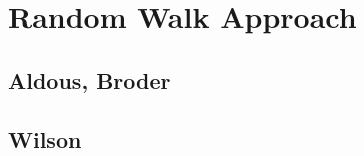 
\chapter{Random Walk Approach} %

\label{Chapter3} %

\section{Aldous, Broder}

\section{Wilson}









